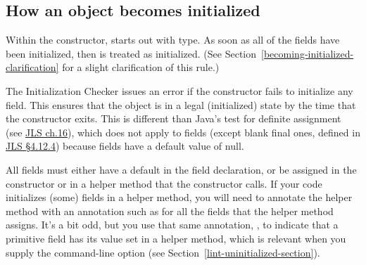 

\subsection{How an object becomes initialized\label{becoming-initialized}}

Within the constructor,
 starts out with  type.
As soon as all of the  fields
have been initialized, then  is treated as initialized.
(See
Section~\ref{becoming-initialized-clarification} for a slight clarification of
this rule.)

The Initialization Checker issues an error if the constructor fails to initialize
any  field.  This ensures that the object is in a legal (initialized)
state by the time that the constructor exits.
This is different than Java's test for definite assignment (see
\href{https://docs.oracle.com/javase/specs/jls/se8/html/jls-16.html}{JLS ch.16}),
which does not apply to fields (except blank final ones, defined in
\href{https://docs.oracle.com/javase/specs/jls/se8/html/jls-4.html#jls-4.12.4}{JLS \S 4.12.4}) because fields
have a default value of null.


All  fields must either have a
default in the field declaration, or be assigned in the constructor or in a
helper method that the constructor calls.  If
your code initializes (some) fields in a helper method, you will need to
annotate the helper method with an annotation such as
for all the fields that the helper method assigns.
It's a bit odd, but you use that same annotation, ,
to indicate that a primitive field has its value set in a helper method,
which is relevant when you supply the 
command-line option (see Section~\ref{lint-uninitialized-section}).



